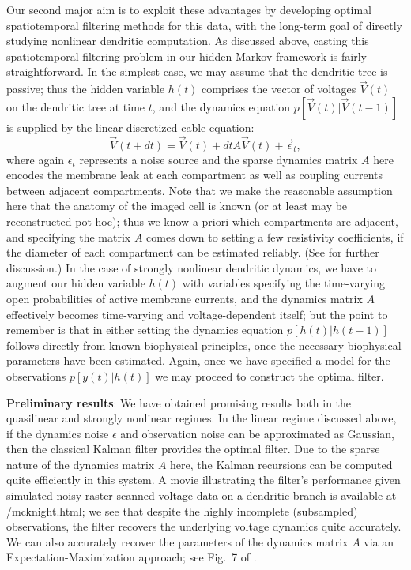 \documentclass[12pt]{article}
\begin{document}
Our second major aim is to exploit these advantages by developing
optimal spatiotemporal filtering methods for this data, with the
long-term goal of directly studying nonlinear dendritic computation.
As discussed above, casting this spatiotemporal filtering problem in
our hidden Markov framework is fairly straightforward.  In the
simplest case, we may assume that the dendritic tree is passive; thus
the hidden variable $h(t)$ comprises the vector of voltages $\vec
V(t)$ on the dendritic tree at time $t$, and the dynamics equation
$p[\vec V(t) | \vec V(t-1)]$ is supplied by the linear discretized
cable equation: 
\begin{equation}
  \vec V(t+dt) = \vec V(t) + dt A \vec V(t) + \vec \epsilon_t,
\label{eq:linear-dynamics}
\end{equation}
where again $\epsilon_t$ represents a noise source and
the sparse dynamics matrix $A$ here encodes the membrane leak at each
compartment as well as coupling currents between adjacent
compartments.  Note that we make the reasonable assumption here that
the anatomy of the imaged cell is known (or at least may be
reconstructed pot hoc); thus we know a priori which compartments are
adjacent, and specifying the matrix $A$ comes down to setting a few
resistivity coefficients, if the diameter of each compartment can be
estimated reliably.  (See \cite{HAP06} for further discussion.)  In
the case of strongly nonlinear dendritic dynamics, we have to augment
our hidden variable $h(t)$ with variables specifying the time-varying
open probabilities of active membrane currents, and the dynamics
matrix $A$ effectively becomes time-varying and voltage-dependent
itself; but the point to remember is that in either setting the
dynamics equation $p[h(t)|h(t-1)]$ follows directly from known
biophysical principles, once the necessary biophysical parameters have
been estimated.  Again, once we have specified a model for the
observations $p[y(t)|h(t)]$ we may proceed to construct the optimal
filter.

\noindent \textbf{Preliminary results}: We have obtained promising
results both in the quasilinear and strongly nonlinear regimes.  In
the linear regime discussed above, if the dynamics noise $\epsilon$
and observation noise can be approximated as Gaussian, then the
classical Kalman filter provides the optimal filter.  Due to the
sparse nature of the dynamics matrix $A$ here, the Kalman recursions
can be computed quite efficiently in this system.  A movie
illustrating the filter's performance given simulated noisy
raster-scanned voltage data on a dendritic branch is available at
\hp/mcknight.html; we see that despite the highly incomplete
(subsampled) observations, the filter recovers the underlying voltage
dynamics quite accurately.  We can also accurately recover the
parameters of the dynamics matrix $A$ via an Expectation-Maximization
approach; see Fig.\ 7 of \cite{HP06}.
\end{document}
